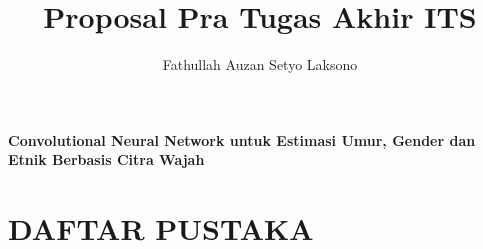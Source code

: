 \documentclass[11pt]{article}
\title{Proposal Pra Tugas Akhir ITS}
\author{Fathullah Auzan Setyo Laksono}
\begin{document}

  
  \newpage

  \begin{center}
    \textbf{Convolutional Neural Network untuk Estimasi Umur, Gender dan Etnik Berbasis Citra Wajah}
  \end{center}

  

  

  

  

  \section{DAFTAR PUSTAKA}
  \renewcommand\refname{}
  \vspace{-2ex}
  
  
\end{document}
